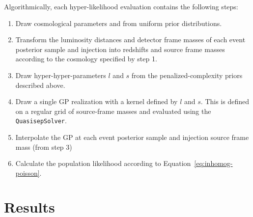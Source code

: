 \documentclass[]{aastex631}
\begin{document}
Algorithmically, each hyper-likelihood evaluation contains the following steps:
\begin{enumerate}
    \item Draw cosmological parameters \Ho{} and \Omm{} from uniform prior distributions.
    \item Transform the luminosity distances and detector frame masses of each event posterior sample and injection into redshifts and source frame masses according to the cosmology specified by step 1.
    \item Draw hyper-hyper-parameters $l$ and $s$ from the penalized-complexity priors described above.
    \item Draw a single \ac{GP} realization with a kernel defined by $l$ and $s$.
    This is defined on a regular grid of source-frame masses and evaluated using the \texttt{QuasisepSolver}.
    \item Interpolate the \ac{GP} at each event posterior sample and injection source frame mass (from step 3)
    \item Calculate the population likelihood according to Equation~\ref{eq:inhomog-poisson}.
\end{enumerate}


\section{Results}
\label{sec:results}
\end{document}

